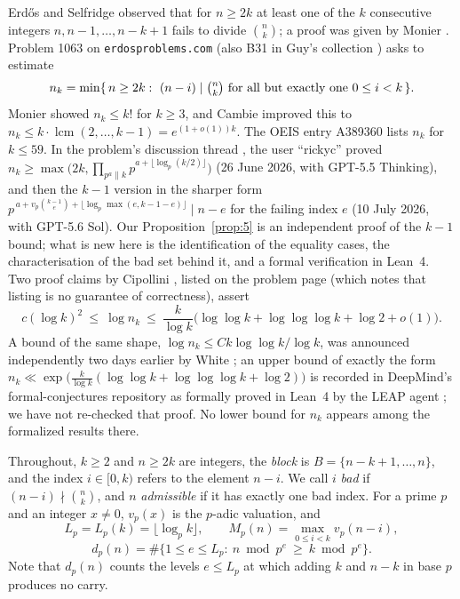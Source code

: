 \documentclass[11pt]{amsart}
\theoremstyle{remark}
\begin{document}
Erd\H{o}s and Selfridge \cite{ErSe83} observed that for $n\ge2k$ at least one of the $k$ consecutive integers $n,n-1,\dots,n-k+1$ fails to divide $\binom nk$; a proof was given by Monier \cite{Mo85}. Problem 1063 on \texttt{erdosproblems.com} \cite{EP1063} (also B31 in Guy's collection \cite{Gu04}) asks to estimate
\[n_k=\min\{\,n\ge2k:\ (n-i)\mid\tbinom nk\text{ for all but exactly one }0\le i<k\,\}.\]
Monier showed $n_k\le k!$ for $k\ge3$, and Cambie improved this to $n_k\le k\cdot\operatorname{lcm}(2,\dots,k-1)=e^{(1+o(1))k}$. The OEIS entry A389360 \cite{OEIS} lists $n_k$ for $k\le59$. In the problem's discussion thread \cite{EP1063}, the user ``rickyc'' proved $n_k\ge\max\big(2k,\prod_{p^a\|k}p^{a+\lfloor\log_p(k/2)\rfloor}\big)$ (26 June 2026, with GPT-5.5 Thinking), and then the $k-1$ version in the sharper form $p^{\,a+v_p\binom{k-1}{e}+\lfloor\log_p\max(e,k-1-e)\rfloor}\mid n-e$ for the failing index $e$ (10 July 2026, with GPT-5.6 Sol). Our Proposition~\ref{prop:5} is an independent proof of the $k-1$ bound; what is new here is the identification of the equality cases, the characterisation of the bad set behind it, and a formal verification in Lean~4. Two proof claims by Cipollini \cite{Ci26a,Ci26b}, listed on the problem page (which notes that listing is no guarantee of correctness), assert
\begin{equation}\label{eq:cip}
c(\log k)^2\ \le\ \log n_k\ \le\ \frac{k}{\log k}\Big(\log\log k+\log\log\log k+\log2+o(1)\Big).
\end{equation}
A bound of the same shape, $\log n_k\le Ck\log\log k/\log k$, was announced independently two days earlier by White \cite{Wh26}; an upper bound of exactly the form $n_k\ll\exp\big(\frac{k}{\log k}(\log\log k+\log\log\log k+\log 2)\big)$ is recorded in DeepMind's formal-conjectures repository as formally proved in Lean~4 by the LEAP agent \cite{Ku26,FC}; we have not re-checked that proof. No lower bound for $n_k$ appears among the formalized results there.

Throughout, $k\ge2$ and $n\ge2k$ are integers, the \emph{block} is $B=\{n-k+1,\dots,n\}$, and the index $i\in[0,k)$ refers to the element $n-i$. We call $i$ \emph{bad} if $(n-i)\nmid\binom nk$, and $n$ \emph{admissible} if it has exactly one bad index. For a prime $p$ and an integer $x\ne0$, $v_p(x)$ is the $p$-adic valuation, and
\[L_p=L_p(k)=\lfloor\log_pk\rfloor,\qquad M_p(n)=\max_{0\le i<k}v_p(n-i),\]
\[d_p(n)=\#\{1\le e\le L_p:\ n\bmod p^e\ \ge\ k\bmod p^e\}.\]
Note that $d_p(n)$ counts the levels $e\le L_p$ at which adding $k$ and $n-k$ in base $p$ produces no carry.
\end{document}
